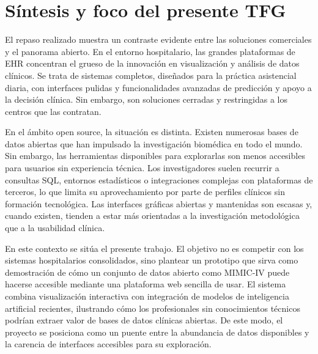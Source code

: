 \newpage
\section{Síntesis y foco del presente TFG}

El repaso realizado muestra un contraste evidente entre las soluciones comerciales y el panorama abierto. En el entorno hospitalario, las grandes plataformas de EHR concentran el grueso de la innovación en visualización y análisis de datos clínicos. Se trata de sistemas completos, diseñados para la práctica asistencial diaria, con interfaces pulidas y funcionalidades avanzadas de predicción y apoyo a la decisión clínica. Sin embargo, son soluciones cerradas y restringidas a los centros que las contratan.

En el ámbito open source, la situación es distinta. Existen numerosas bases de datos abiertas que han impulsado la investigación biomédica en todo el mundo. Sin embargo, las herramientas disponibles para explorarlas son menos accesibles para usuarios sin experiencia técnica. Los investigadores suelen recurrir a consultas SQL, entornos estadísticos o integraciones complejas con plataformas de terceros, lo que limita su aprovechamiento por parte de perfiles clínicos sin formación tecnológica. Las interfaces gráficas abiertas y mantenidas son escasas y, cuando existen, tienden a estar más orientadas a la investigación metodológica que a la usabilidad clínica.

En este contexto se sitúa el presente trabajo. El objetivo no es competir con los sistemas hospitalarios consolidados, sino plantear un prototipo que sirva como demostración de cómo un conjunto de datos abierto como MIMIC-IV puede hacerse accesible mediante una plataforma web sencilla de usar. El sistema combina visualización interactiva con integración de modelos de inteligencia artificial recientes, ilustrando cómo los profesionales sin conocimientos técnicos podrían extraer valor de bases de datos clínicas abiertas. De este modo, el proyecto se posiciona como un puente entre la abundancia de datos disponibles y la carencia de interfaces accesibles para su exploración.


